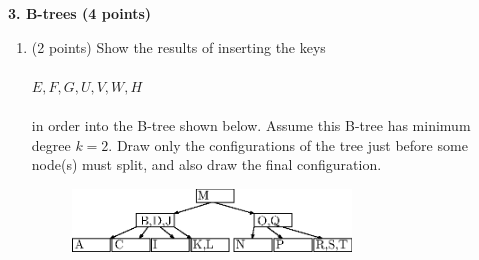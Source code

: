 \documentclass[12pt]{elsart}
\begin{document}
{\bf 3.  B-trees (4 points)}

\begin{enumerate}
   \item (2 points) Show the results of inserting the keys\\\\
$E,F,G,U,V,W,H$\\\\
in order into the B-tree shown below.  Assume this B-tree has minimum degree $k=2$. Draw only the configurations
of the tree just before some node(s) must split, and also draw the final configuration.

\vspace{-1.5mm}
\begin{figure}[h]
	\centering \includegraphics[width=0.7\textwidth]{BTreeProblem-01}
\end{figure}
\vspace{-1.5mm}
\newpage
	

\end{enumerate}
\end{document}
